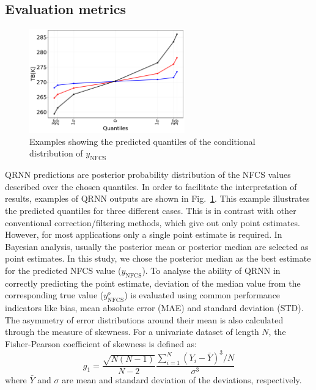 \documentclass[amt, manuscript]{copernicus}
\newcommand{\ynfcs}{y_\text{NFCS}}
\newcommand{\yonfcs}{y^{o}_\text{NFCS}}
\begin{document}
\subsection{Evaluation metrics}
\label{sec:validation}
\begin{figure}[t]
	\centering
	\includegraphics[height=45mm]{Figures/posterior_distribution_I1V.pdf} 
	\caption{Examples showing the predicted quantiles of the conditional distribution of $\ynfcs$ }
	\label{fig:posterior_distribution_I1V}	
\end{figure}
QRNN predictions are posterior probability distribution of the NFCS values described over the chosen quantiles. In order to facilitate the interpretation of results, examples of QRNN outputs are shown in Fig.~\ref{fig:posterior_distribution_I1V}. This example illustrates the predicted quantiles for three different cases. This is in contrast with other conventional correction/filtering methods, which give out only point estimates. However, for most applications only a single point estimate is required. In Bayesian analysis, usually the posterior mean or posterior median are selected as point estimates. In this study, we chose the posterior median as the best estimate for the predicted NFCS value ($\ynfcs$). To analyse the ability of QRNN in correctly predicting the point estimate, deviation of the median value from the corresponding true value ($\yonfcs$) is evaluated using common performance indicators like bias, mean absolute error (MAE) and standard deviation (STD). The asymmetry of error distributions around their mean is also calculated through the measure of skewness. For a univariate dataset of length $N$, the Fisher-Pearson coefficient of skewness is defined as: 
\begin{equation}
g_1 = 	\frac{\sqrt{N(N-1)}}{N-2} \frac{\sum_{i = 1}^{N}(Y_i - \bar{Y})^3/N}{\sigma^3}
\end{equation}
where $\bar{Y}$ and $\sigma$ are mean and standard deviation of the deviations, respectively.
\end{document}

